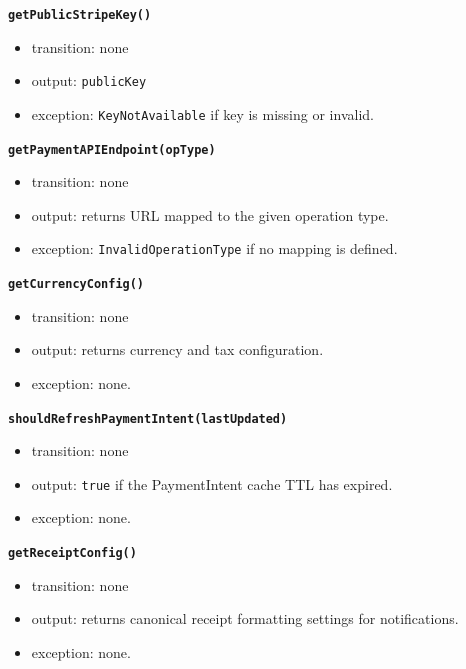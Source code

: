 \documentclass[12pt, titlepage]{article}
\begin{document}
\noindent\textbf{\texttt{getPublicStripeKey()}}
\begin{itemize}
\item transition: none
\item output: \texttt{publicKey}
\item exception: \texttt{KeyNotAvailable} if key is missing or invalid.
\end{itemize}

\vspace{0.2cm}

\noindent\textbf{\texttt{getPaymentAPIEndpoint(opType)}}
\begin{itemize}
\item transition: none
\item output: returns URL mapped to the given operation type.
\item exception: \texttt{InvalidOperationType} if no mapping is defined.
\end{itemize}

\vspace{0.2cm}

\noindent\textbf{\texttt{getCurrencyConfig()}}
\begin{itemize}
\item transition: none
\item output: returns currency and tax configuration.
\item exception: none.
\end{itemize}

\vspace{0.2cm}

\noindent\textbf{\texttt{shouldRefreshPaymentIntent(lastUpdated)}}
\begin{itemize}
\item transition: none
\item output: \texttt{true} if the PaymentIntent cache TTL has expired.
\item exception: none.
\end{itemize}

\vspace{0.2cm}

\noindent\textbf{\texttt{getReceiptConfig()}}
\begin{itemize}
\item transition: none
\item output: returns canonical receipt formatting settings for notifications.
\item exception: none.
\end{itemize}
\end{document}
